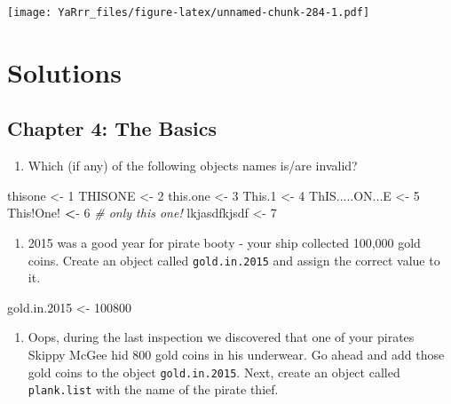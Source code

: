 \documentclass[]{book}
\newenvironment{Shaded}{\begin{snugshade}}{\end{snugshade}}
\newcommand{\DecValTok}[1]{\textcolor[rgb]{0.00,0.00,0.81}{{#1}}}
\newcommand{\FloatTok}[1]{\textcolor[rgb]{0.00,0.00,0.81}{{#1}}}
\newcommand{\StringTok}[1]{\textcolor[rgb]{0.31,0.60,0.02}{{#1}}}
\newcommand{\CommentTok}[1]{\textcolor[rgb]{0.56,0.35,0.01}{\textit{{#1}}}}
\newcommand{\ErrorTok}[1]{\textcolor[rgb]{0.64,0.00,0.00}{\textbf{{#1}}}}
\newcommand{\NormalTok}[1]{{#1}}
\providecommand{\tightlist}{%
  \setlength{\itemsep}{0pt}\setlength{\parskip}{0pt}}
\theoremstyle{definition}
\theoremstyle{definition}
\theoremstyle{remark}
\begin{document}
\texttt{[image: YaRrr\_files/figure-latex/unnamed-chunk-284-1.pdf]}

\chapter{Solutions}\label{solutions}

\section{Chapter 4: The Basics}\label{chapter-4-the-basics}

\begin{enumerate}
\def\labelenumi{\arabic{enumi}.}
\setcounter{enumi}{1}
\tightlist
\item
  Which (if any) of the following objects names is/are invalid?
\end{enumerate}

\begin{Shaded}
\begin{Highlighting}[]
\NormalTok{thisone <-}\StringTok{ }\DecValTok{1}
\NormalTok{THISONE <-}\StringTok{ }\DecValTok{2}
\NormalTok{this.one <-}\StringTok{ }\DecValTok{3}
\NormalTok{This}\FloatTok{.1} \NormalTok{<-}\StringTok{ }\DecValTok{4}
\NormalTok{ThIS.....ON...E <-}\StringTok{ }\DecValTok{5}
\NormalTok{This!One!}\StringTok{ }\ErrorTok{<}\NormalTok{-}\StringTok{ }\DecValTok{6}           \CommentTok{# only this one!}
\NormalTok{lkjasdfkjsdf <-}\StringTok{ }\DecValTok{7}
\end{Highlighting}
\end{Shaded}

\begin{enumerate}
\def\labelenumi{\arabic{enumi}.}
\setcounter{enumi}{2}
\tightlist
\item
  2015 was a good year for pirate booty - your ship collected 100,000
  gold coins. Create an object called \texttt{gold.in.2015} and assign
  the correct value to it.
\end{enumerate}

\begin{Shaded}
\begin{Highlighting}[]
\NormalTok{gold.in}\FloatTok{.2015} \NormalTok{<-}\StringTok{ }\DecValTok{100800}
\end{Highlighting}
\end{Shaded}

\begin{enumerate}
\def\labelenumi{\arabic{enumi}.}
\setcounter{enumi}{3}
\tightlist
\item
  Oops, during the last inspection we discovered that one of your
  pirates Skippy McGee hid 800 gold coins in his underwear. Go ahead and
  add those gold coins to the object \texttt{gold.in.2015}. Next, create
  an object called \texttt{plank.list} with the name of the pirate
  thief.
\end{enumerate}
\end{document}
